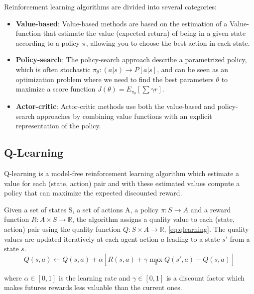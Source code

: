\noindent
Reinforcement learning algorithms are divided into several categories:
\begin{itemize}
    \item \textbf{Value-based}: Value-based methods are based on the estimation of a Value-function that estimate the value (expected return) of being in a given state according to a policy $\pi$,
    allowing you to choose the best action in each state.

    \item \textbf{Policy-search}: The policy-search approach describe a parametrized policy, which is often stochastic $\pi_{\theta}:(a | s)\rightarrow P[a | s]$, 
    and can be seen as an optimization problem where we need to find the best parameters $\theta$ to maximize
    a score function $J(\theta) = E_{\pi_\theta}[\sum \gamma r]$.
    
    \item \textbf{Actor-critic}: Actor-critic methods use both the value-based and policy-search approaches by combining value
    functions with an explicit representation of the policy.
\end{itemize}

\subsection{Q-Learning}
Q-learning \cite{watkins1992q} is a model-free reinforcement learning algorithm which estimate a value for each (state, action) pair
and with these estimated values compute a policy that can maximize the expected discounted reward.

Given a set of states S, a set of actions A, a policy $\pi : S \rightarrow A$ and a reward function $R : A \times S \rightarrow \mathbb{R}$, the algorithm assigns a quality value to each (state, action) pair using the quality function $Q : S \times A \rightarrow \mathbb{R}$, \cref{eq:qlearning}.
The quality values are updated iteratively at each agent action $a$ leading to a state $s'$ from a state $s$.
\begin{equation}
    Q(s, a) \leftarrow Q(s, a) + \alpha [R(s, a) + \gamma \max_a Q(s', a) - Q(s, a)]
    \label{eq:qlearning}
\end{equation}

where $\alpha \in [0, 1]$ is the learning rate and $\gamma \in [0, 1]$ is a discount factor which makes futures rewards less valuable than the current ones.


